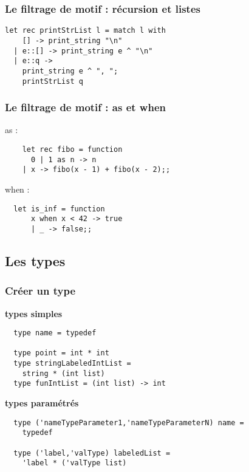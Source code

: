 \begin{frame}[fragile]
	\frametitle{Le filtrage de motif : récursion et listes}
		\begin{lstlisting}
let rec printStrList l = match l with
    [] -> print_string "\n"
  | e::[] -> print_string e ^ "\n"
  | e::q -> 
    print_string e ^ ", ";
    printStrList q
		\end{lstlisting}
\end{frame}

\begin{frame}[fragile]
  \frametitle{Le filtrage de motif : as et when}
  \begin{itemize}
  \begin{minipage}[t]{5cm}
  \item
    as :
    \begin{lstlisting}
	let rec fibo = function 
 	  0 | 1 as n -> n 
 	| x -> fibo(x - 1) + fibo(x - 2);; 
    \end{lstlisting}
  \end{minipage}
  \begin{minipage}[t]{5cm}
  \item
    when :
    \begin{lstlisting}
  let is_inf = function 
      x when x < 42 -> true
 	  | _ -> false;;
    \end{lstlisting}
  \end{minipage}
  \end{itemize}
\end{frame}

\subsection{Les types} %
\begin{frame}[fragile]
	\frametitle{Créer un type}
	\textbf{types simples}
	\begin{lstlisting}
  type name = typedef

  type point = int * int
  type stringLabeledIntList = 
    string * (int list)
  type funIntList = (int list) -> int
	\end{lstlisting}
	\textbf{types paramétrés}
	\lstset{basicstyle=\scriptsize}
	\begin{lstlisting}
  type ('nameTypeParameter1,'nameTypeParameterN) name = 
    typedef
    
  type ('label,'valType) labeledList =
    'label * ('valType list) 
	\end{lstlisting}
\end{frame}

